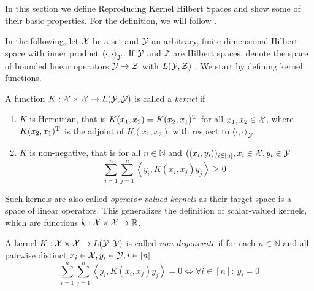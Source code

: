 In this section we define Reproducing Kernel Hilbert Spaces and show some of their basic properties.
For the definition, we will follow \cite{owhadi20}.


In the following, let $\mathcal{X}$ be a set and $\mathcal{Y}$ an arbitrary, finite dimensional Hilbert space with inner product $\left<\cdot, \cdot \right>_{\mathcal{Y}}$.
If $\mathcal{Y}$ and $\mathcal{Z}$ are Hilbert spaces, denote the space of bounded linear operators $\mathcal{Y} \rightarrow \mathcal{Z}$ with $L(\mathcal{Y}, \mathcal{Z})$ .
We start by defining kernel functions.
\begin{definition}
	\label{def:kernel}
	A function $K: \mathcal{X} \times \mathcal{X} \rightarrow L(\mathcal{Y}, \mathcal{Y})$ is called a \emph{kernel} if
	\begin{enumerate}
		\item $K$ is Hermitian, that is $K(x_1, x_2) = K(x_2, x_1)^{\mathrm{T}}$ for all $x_1, x_2 \in \mathcal{X}$, where $K(x_2, x_1)^{\mathrm{T}}$ is the adjoint of $K(x_1, x_2)$ with respect to $\left<\cdot, \cdot\right>_{\mathcal{Y}}$.
		\item $K$ is non-negative, that is for all $n \in \mathbb{N}$ and $((x_i, y_i))_{i \in [n]}, x_i \in \mathcal{X}, y_i \in \mathcal{Y}$
		\begin{equation}
			\sum_{i=1}^n \sum_{j=1}^n \left< y_i, K(x_i, x_j)  y_j\right> \geq 0 \ .
		\end{equation}
	\end{enumerate}
\end{definition}

Such kernels are also called \emph{operator-valued kernels} as their target space is a space of linear operators.
This generalizes the definition of scalar-valued kernels, which are functions $k: \mathcal{X} \times \mathcal{X} \rightarrow \mathbb{R}$.

\begin{definition}
	A kernel $K: \mathcal{X} \times \mathcal{X} \rightarrow L(\mathcal{Y}, \mathcal{Y})$ is called \emph{non-degenerate} if for each $n \in \mathbb{N}$ and all pairwise distinct $x_i \in \mathcal{X}, y_i \in \mathcal{Y}, i \in [n]$
	\begin{equation}
		\sum_{i=1}^n \sum_{j=1}^n \left< y_i, K(x_i, x_j)  y_j\right> = 0 \Leftrightarrow \forall i \in [n]:~ y_i = 0
	\end{equation}
\end{definition}

